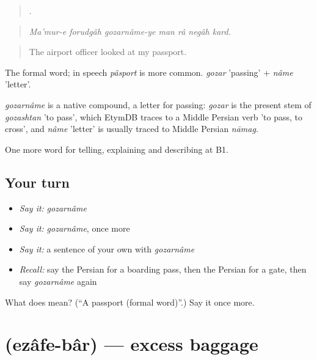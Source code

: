 \begin{quote}
      .
\end{quote}

\begin{quote}
\emph{Ma'mur-e forudgâh gozarnâme-ye man râ negâh kard.}
\end{quote}

\begin{quote}
The airport officer looked at my passport.
\end{quote}

The formal word; in speech \emph{pâsport} is more common. \emph{gozar} 'passing' + \emph{nâme} 'letter'.

\begin{cousinweb}
\emph{gozarnâme} is a native compound, a letter for passing: \emph{gozar} is the present stem of \emph{gozashtan} 'to pass', which EtymDB traces to a Middle Persian verb 'to pass, to cross', and \emph{nâme} 'letter' is usually traced to Middle Persian \emph{nāmag}.
\end{cousinweb}

\begin{grammarlens}[title={What you've built}]
One more word for telling, explaining and describing at B1.
\end{grammarlens}

\subsection*{Your turn}
\begin{itemize}
\raggedright
  \item \emph{Say it:} \emph{gozarnâme}
  \item \emph{Say it:} \emph{gozarnâme}, once more
  \item \emph{Say it:} a sentence of your own with \emph{gozarnâme}
  \item \emph{Recall:} say the Persian for a boarding pass, then the Persian for a gate, then say \emph{gozarnâme} again
\end{itemize}

\begin{tcolorbox}[breakable,colback=teal!4,colframe=teal!35!black,title={Before you move on}]
What does  mean? (\textquotedblleft{}A passport (formal word)\textquotedblright{}.) Say it once more.
\end{tcolorbox}
\section[\texorpdfstring{\fa{اضافه} \fa{بار} (ezâfe-bâr)}{اضافه بار (ezâfe-bâr)}]{  (ezâfe-bâr) — excess baggage}

